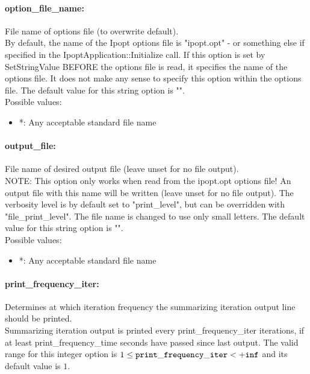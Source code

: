 \paragraph{option\_file\_name:}\label{opt:option_file_name} File name of options file (to overwrite default). \\
 By default, the name of the Ipopt options file is "ipopt.opt" - or something else if specified in the IpoptApplication::Initialize call. If this option is set by SetStringValue BEFORE the options file is read, it specifies the name of the options file.  It does not make any sense to specify this option within the options file. The default value for this string option is "".
\\ 
Possible values:
\begin{itemize}
   \item *: Any acceptable standard file name
\end{itemize}

\paragraph{output\_file:}\label{opt:output_file} File name of desired output file (leave unset for no file output). \\
 NOTE: This option only works when read from the ipopt.opt options file! An output file with this name will be written (leave unset for no file output).  The verbosity level is by default set to "print\_level", but can be overridden with "file\_print\_level".  The file name is changed to use only small letters. The default value for this string option is "".
\\ 
Possible values:
\begin{itemize}
   \item *: Any acceptable standard file name
\end{itemize}

\paragraph{print\_frequency\_iter:}\label{opt:print_frequency_iter} Determines at which iteration frequency the summarizing iteration output line should be printed. \\
 Summarizing iteration output is printed every print\_frequency\_iter iterations, if at least print\_frequency\_time seconds have passed since last output. The valid range for this integer option is
$1 \le {\tt print\_frequency\_iter } <  {\tt +inf}$
and its default value is $1$.



